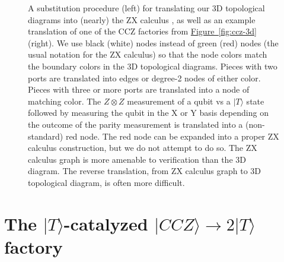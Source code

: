 \documentclass[superscriptaddress,notitlepage,longbibliography]{revtex4-1}
\newcommand{\fig}[1]{\hyperref[fig:#1]{Figure~\ref*{fig:#1}}}
\begin{document}
\begin{figure}[ht]
  \label{fig:ccz-graph}
  \caption{
    A substitution procedure (left) for translating our 3D topological diagrams into (nearly) the ZX calculus \cite{de2017}, as well as an example translation of one of the CCZ factories from \fig{ccz-3d} (right).
    We use black (white) nodes instead of green (red) nodes (the usual notation for the ZX calculus) so that the node colors match the boundary colors in the 3D topological diagrams.
    Pieces with two ports are translated into edges or degree-2 nodes of either color.
    Pieces with three or more ports are translated into a node of matching color.
    The $Z \otimes Z$ measurement of a qubit vs a $|T\rangle$ state followed by measuring the qubit in the X or Y basis depending on the outcome of the parity measurement is translated into a (non-standard) red node.
    The red node can be expanded into a proper ZX calculus construction, but we do not attempt to do so.
    The ZX calculus graph is more amenable to verification than the 3D diagram.
    The reverse translation, from ZX calculus graph to 3D topological diagram, is often more difficult.
  }
\end{figure}




\section{\texorpdfstring{
    The $|T\rangle$-catalyzed $|CCZ\rangle \rightarrow 2|T\rangle$ factory
}{
    The T-catalyzed CCZ to 2T Factory
}}
\label{sec:catalysis}
\end{document}
